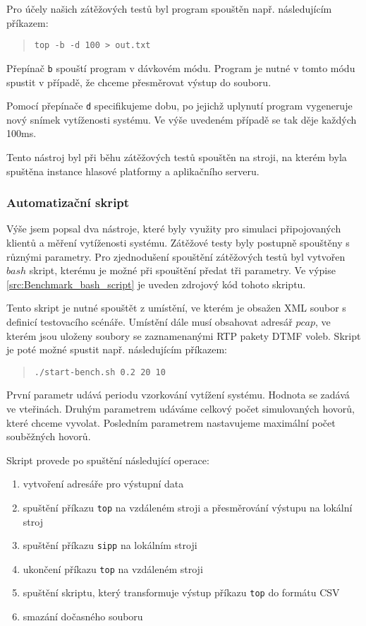 \documentclass[ing,male,java,dept460,twoside]{diploma}						%
\begin{document}
Pro účely našich zátěžových testů byl program spouštěn např. následujícím příkazem:

\begin{quote}
	\texttt{top -b -d 100 > out.txt}
\end{quote}

Přepínač \texttt{b} spouští program v dávkovém módu. Program je nutné v tomto módu spustit v případě, že chceme přesměrovat výstup do souboru.

Pomocí přepínače \texttt{d} specifikujeme dobu, po jejichž uplynutí program vygeneruje nový snímek vytíženosti systému. Ve výše uvedeném případě se tak děje každých 100ms.

Tento nástroj byl při běhu zátěžových testů spouštěn na stroji, na kterém byla spuštěna instance hlasové platformy a aplikačního serveru.

\subsubsection{Automatizační skript}
Výše jsem popsal dva nástroje, které byly využity pro simulaci připojovaných klientů a měření vytíženosti systému. Zátěžové testy byly postupně spouštěny s různými parametry. Pro zjednodušení spouštění zátěžových testů byl vytvořen $bash$ skript, kterému je možné při spouštění předat tři parametry. Ve výpise \ref{src:Benchmark_bash_script} je uveden zdrojový kód tohoto skriptu.



Tento skript je nutné spouštět z umístění, ve kterém je obsažen XML soubor s definicí testovacího scénáře. Umístění dále musí obsahovat adresář $pcap$, ve kterém jsou uloženy soubory se zaznamenanými RTP pakety DTMF voleb. Skript je poté možné spustit např. následujícím příkazem:

\begin{quote}
	\texttt{./start-bench.sh 0.2 20 10}
\end{quote}

První parametr udává periodu vzorkování vytížení systému. Hodnota se zadává ve vteřinách. Druhým parametrem udáváme celkový počet simulovaných hovorů, které chceme vyvolat. Posledním parametrem nastavujeme maximální počet souběžných hovorů.

Skript provede po spuštění následující operace:

\begin{enumerate}
\item vytvoření adresáře pro výstupní data
\item spuštění příkazu \texttt{top} na vzdáleném stroji a přesměrování výstupu na lokální stroj
\item spuštění příkazu \texttt{sipp} na lokálním stroji
\item ukončení příkazu \texttt{top} na vzdáleném stroji
\item spuštění skriptu, který transformuje výstup příkazu \texttt{top} do formátu CSV
\item smazání dočasného souboru
\end{enumerate}
\end{document}
